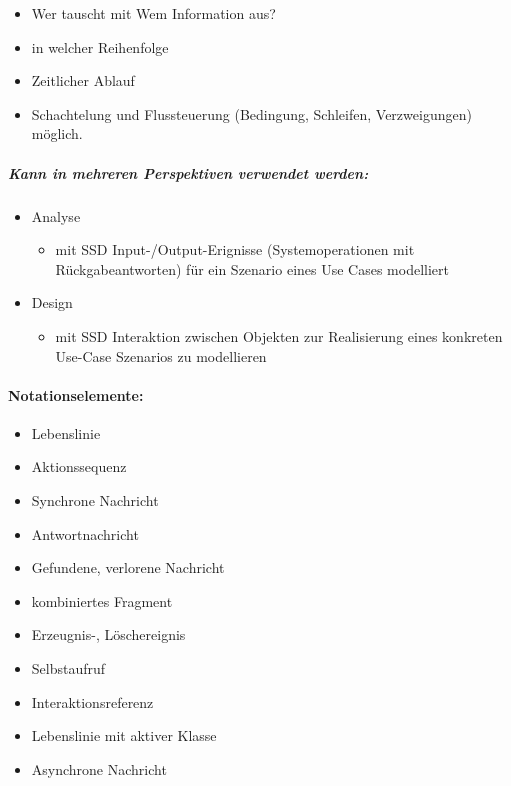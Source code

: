\documentclass[../ZF_SWEN1.tex]{subfiles}
\begin{document}
\begin{itemize}
	\item Wer tauscht mit Wem Information aus?
	\item in welcher Reihenfolge
	\item Zeitlicher Ablauf
	\item Schachtelung und Flussteuerung (Bedingung, Schleifen, Verzweigungen) möglich.
\end{itemize}

\subparagraph{\textcolor {WildStrawberry}{\textbf{Kann in mehreren Perspektiven verwendet werden:}}}
\begin{itemize}
	\item \textcolor {Periwinkle}{Analyse}
	\begin{itemize}
		\item mit SSD Input-/Output-Erignisse (Systemoperationen mit Rückgabeantworten) für ein Szenario eines Use Cases modelliert
	\end{itemize}
	\item \textcolor {Periwinkle}{Design}
	\begin{itemize}
		\item mit SSD Interaktion zwischen Objekten zur Realisierung eines konkreten Use-Case Szenarios zu modellieren
	\end{itemize}
\end{itemize}

\paragraph{Notationselemente:}
\begin{itemize}
	\item Lebenslinie
	\item Aktionssequenz
	\item Synchrone Nachricht
	\item Antwortnachricht
	\item Gefundene, verlorene Nachricht
	\item kombiniertes Fragment
	\item Erzeugnis-, Löschereignis
	\item Selbstaufruf
	\item Interaktionsreferenz
	\item Lebenslinie mit aktiver Klasse
	\item Asynchrone Nachricht
\end{itemize}
\end{document}
